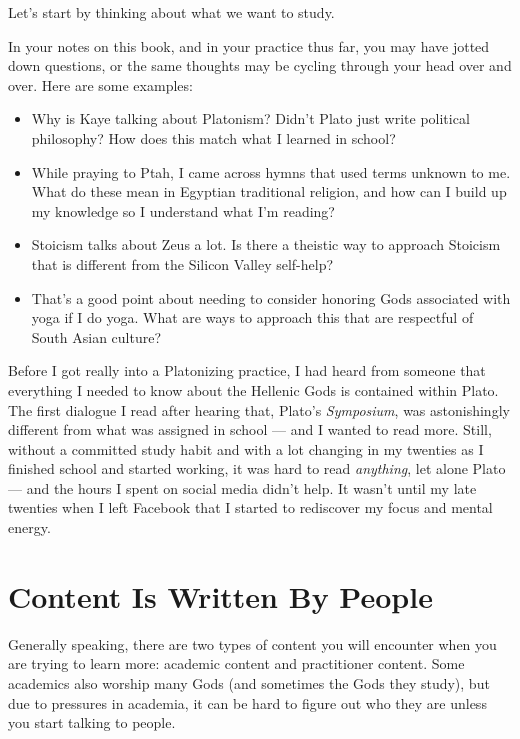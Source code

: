 \documentclass[
]{book}
\providecommand{\tightlist}{%
  \setlength{\itemsep}{0pt}\setlength{\parskip}{0pt}}
\begin{document}
Let's start by thinking about what we want to study.

In your notes on this book, and in your practice thus far, you may have jotted down questions, or the same thoughts may be cycling through your head over and over. Here are some examples:

\begin{itemize}
\tightlist
\item
  Why is Kaye talking about Platonism? Didn't Plato just write political philosophy? How does this match what I learned in school?
\item
  While praying to Ptah, I came across hymns that used terms unknown to me. What do these mean in Egyptian traditional religion, and how can I build up my knowledge so I understand what I'm reading?
\item
  Stoicism talks about Zeus a lot. Is there a theistic way to approach Stoicism that is different from the Silicon Valley self-help?
\item
  That's a good point about needing to consider honoring Gods associated with yoga if I do yoga. What are ways to approach this that are respectful of South Asian culture?
\end{itemize}

Before I got really into a Platonizing practice, I had heard from someone that everything I needed to know about the Hellenic Gods is contained within Plato. The first dialogue I read after hearing that, Plato's \emph{Symposium}, was astonishingly different from what was assigned in school --- and I wanted to read more. Still, without a committed study habit and with a lot changing in my twenties as I finished school and started working, it was hard to read \emph{anything}, let alone Plato --- and the hours I spent on social media didn't help. It wasn't until my late twenties when I left Facebook that I started to rediscover my focus and mental energy.

\hypertarget{content-is-written-by-people}{%
\section{Content Is Written By People}\label{content-is-written-by-people}}

Generally speaking, there are two types of content you will encounter when you are trying to learn more: academic content and practitioner content. Some academics also worship many Gods (and sometimes the Gods they study), but due to pressures in academia, it can be hard to figure out who they are unless you start talking to people.
\end{document}
